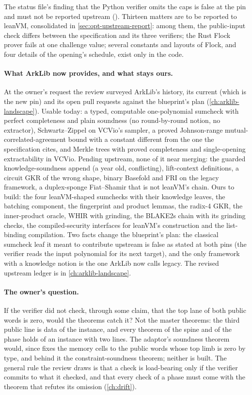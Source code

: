 The status file's finding that the Python verifier omits the caps is false at the pin and must
not be reported upstream (). Thirteen matters are to be reported to leanVM, consolidated in \cref{sec:opt-upstream-report}:
among them, the public-input check differs between the specification and its three verifiers;
the Rust Flock prover fails at one challenge value; several constants and layouts of Flock, and
four details of the opening's schedule, exist only in the code.

\paragraph{What ArkLib now provides, and what stays ours.} At the owner's request the review
surveyed ArkLib's history, its current  (which is the new pin) and its open pull
requests against the blueprint's plan (\cref{ch:arklib-landscape}). Usable today: a typed,
computable one-polynomial sumcheck with perfect completeness and plain soundness (no
round-by-round notion, no extractor), Schwartz--Zippel on VCVio's sampler, a proved
Johnson-range mutual-correlated-agreement bound with a constant different from the one the
specification cites, and Merkle trees with proved completeness and single-opening
extractability in VCVio. Pending upstream, none of it near merging: the guarded
knowledge-soundness append (a year old, conflicting), lift-context definitions, a circuit GKR
of the wrong shape, binary Basefold and FRI on the legacy framework, a duplex-sponge
Fiat--Shamir that is not leanVM's chain. Ours to build: the four leanVM-shaped sumchecks with
their knowledge leaves, the batching component, the fingerprint and product lemmas, the
radix-4 GKR, the inner-product oracle, WHIR with grinding, the BLAKE2s chain with its
grinding checks, the compiled-security interfaces for leanVM's construction and the
list-binding compilation. Two facts change the blueprint's plan: the classical sumcheck leaf it
meant to contribute upstream is false as stated at both pins (the verifier reads the input
polynomial for its next target), and the only framework with a knowledge notion is the one
ArkLib now calls legacy. The revised upstream ledger is in \cref{ch:arklib-landscape}.

\paragraph{The owner's question.} If the verifier did not check, through some claim, that the
top lane of both public words is zero, would the theorems catch it? Not the master theorems:
the third public line is data of the instance, and every theorem of the spine and of the phase
holds of an instance with two lines. The adaptor's soundness theorem would, since
 fixes the memory cells to the public words whose top limb is zero by type,
and behind it the constraint-soundness theorem; neither is built. The general rule the review
draws is that a check is load-bearing only if the verifier commits to what it checked, and
that every check of a phase must come with the theorem that refutes its omission
(\cref{ch:drift}).

